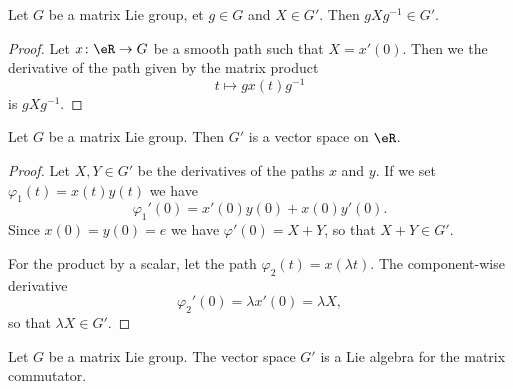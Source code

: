 \begin{lemma}
	Let \( G\) be a matrix Lie group, et \( g\in G\) and \( X\in G'\). Then \( gXg^{-1}\in G'\).
\end{lemma}

\begin{proof}
	Let \( x\colon \eR\to G\) be a smooth path such that \( X=x'(0)\). Then we the derivative of the path given by the matrix product
	\begin{equation}
		t\mapsto gx(t)g^{-1}
	\end{equation}
	is \( gXg^{-1}\).
\end{proof}

\begin{lemma}        \label{LEMooHQUYooSoiKbI}
	Let \( G\) be a matrix Lie group. Then \( G'\) is a vector space on \( \eR\).
\end{lemma}

\begin{proof}
	Let \( X,Y\in G'\) be the derivatives of the paths \( x\) and \( y\). If we set \( \varphi_1(t)=x(t)y(t)\) we have
	\begin{equation}
		\varphi_1'(0)=x'(0)y(0)+x(0)y'(0).
	\end{equation}
	Since \( x(0)=y(0)=e\) we have \( \varphi'(0)=X+Y\), so that \( X+Y\in G'\).

	For the product by a scalar, let the path \( \varphi_2(t)=x(\lambda t)\). The component-wise derivative
	\begin{equation}
		\varphi_2'(0)=\lambda x'(0)=\lambda X,
	\end{equation}
	so that \( \lambda X\in G'\).
\end{proof}

\begin{proposition}     \label{PROPooUKITooLnEKZW}
	Let \( G\) be a matrix Lie group. The vector space \( G'\) is a Lie algebra for the matrix commutator.
\end{proposition}

